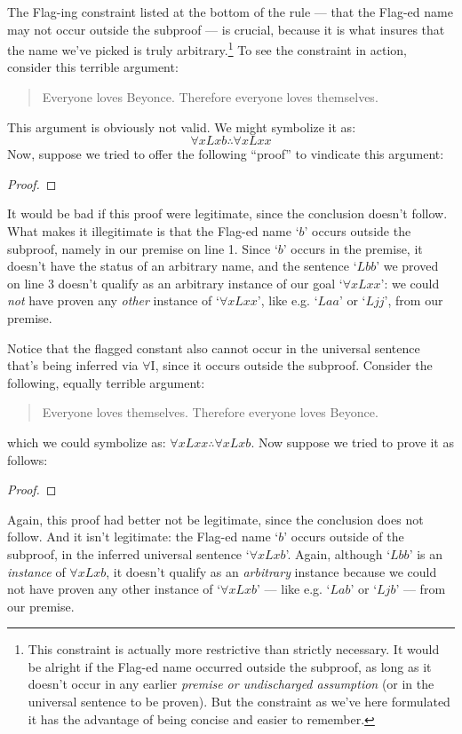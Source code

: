 The Flag-ing constraint listed at the bottom of the rule --- that the Flag-ed name may not occur outside the subproof --- is crucial, because it is what insures that the name we've picked is truly arbitrary.\footnote{This constraint is actually more restrictive than strictly necessary.  It would be alright if the Flag-ed name occurred outside the subproof, as long as it doesn't occur in any earlier \emph{premise or undischarged assumption} (or in the universal sentence to be proven). But the constraint as we've here formulated it has the advantage of being concise and easier to remember.}  To see the constraint in action, consider this terrible argument:
	\begin{quote}
		Everyone loves Beyonce.  Therefore everyone loves themselves.
	\end{quote}
This argument is obviously not valid.  We might symbolize it as:
$$\forall x Lxb \therefore \forall x Lxx$$
Now, suppose we tried to offer the following ``proof'' to vindicate this argument:
\begin{proof}
	 
	\open
	 \fl{}
	 
	\close
	 
\end{proof}\noindent
It would be bad if this proof were legitimate, since the conclusion doesn't follow.  What makes it illegitimate is that the Flag-ed name `$b$' occurs outside the subproof, namely in our premise on line 1. Since `$b$' occurs in the premise, it doesn't have the status of an arbitrary name, and the sentence `$Lbb$' we proved on line 3 doesn't qualify as an arbitrary instance of our goal `$\forall xLxx$': we could \emph{not} have proven any \emph{other} instance of `$\forall xLxx$', like e.g. `$Laa$' or `$Ljj$', from our premise.

Notice that the flagged constant also cannot occur in the universal sentence that's being inferred via $\forall$I, since it occurs outside the subproof.  Consider the following, equally terrible argument:

	\begin{quote}
		Everyone loves themselves.  Therefore everyone loves Beyonce.
\end{quote}
which we could symbolize as: $\forall xLxx \therefore \forall xLxb$.  Now suppose we tried to prove it as follows:
\begin{proof}
	 
	\open
	 \fl{}
	 
	\close
	 
\end{proof}\noindent
Again, this proof had better not be legitimate, since the conclusion does not follow.  And it isn't legitimate: the Flag-ed name `$b$' occurs outside of the subproof, in the inferred universal sentence `$\forall x Lxb$'.  Again, although `$Lbb$' is an \emph{instance} of $\forall xLxb$, it doesn't qualify as an \emph{arbitrary} instance because we could not have proven any other instance of `$\forall xLxb$' --- like e.g. `$Lab$' or `$Ljb$' --- from our premise.

